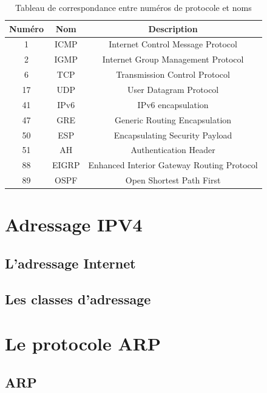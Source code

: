 \documentclass[12pt]{article}
\begin{document}
\begin{table}[h]
    \centering
    \begin{tabular}{|c|c|c|}
    \hline
    Numéro & Nom & Description \\
    \hline
    1 & ICMP & Internet Control Message Protocol \\
    \hline
    2 & IGMP & Internet Group Management Protocol \\
    \hline
    6 & TCP & Transmission Control Protocol \\
    \hline
    17 & UDP & User Datagram Protocol \\
    \hline
    41 & IPv6 & IPv6 encapsulation \\
    \hline
    47 & GRE & Generic Routing Encapsulation \\
    \hline
    50 & ESP & Encapsulating Security Payload \\
    \hline
    51 & AH & Authentication Header \\
    \hline
    88 & EIGRP & Enhanced Interior Gateway Routing Protocol \\
    \hline
    89 & OSPF & Open Shortest Path First \\
    \hline
    \end{tabular}
    \caption{Tableau de correspondance entre numéros de protocole et noms}
    \label{tab:protocol_numbers}
\end{table}


\section{Adressage IPV4}

\subsection{L’adressage Internet}

\subsection{Les classes d'adressage}

\section{Le protocole ARP}

\subsection{ARP}
\end{document}
